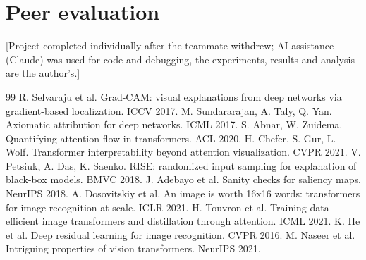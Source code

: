 \documentclass[10pt,twocolumn]{article}
\newcommand{\todo}[1]{{\color{red}[#1]}}
\begin{document}
\section*{Peer evaluation}
\todo{Project completed individually after the teammate withdrew; AI assistance (Claude) was used for code and debugging, the experiments, results and analysis are the author's.}

\begin{thebibliography}{99}\small
{} R. Selvaraju et al. Grad-CAM: visual explanations from deep networks via gradient-based localization. ICCV 2017.
 M. Sundararajan, A. Taly, Q. Yan. Axiomatic attribution for deep networks. ICML 2017.
 S. Abnar, W. Zuidema. Quantifying attention flow in transformers. ACL 2020.
 H. Chefer, S. Gur, L. Wolf. Transformer interpretability beyond attention visualization. CVPR 2021.
 V. Petsiuk, A. Das, K. Saenko. RISE: randomized input sampling for explanation of black-box models. BMVC 2018.
 J. Adebayo et al. Sanity checks for saliency maps. NeurIPS 2018.
 A. Dosovitskiy et al. An image is worth 16x16 words: transformers for image recognition at scale. ICLR 2021.
 H. Touvron et al. Training data-efficient image transformers and distillation through attention. ICML 2021.
 K. He et al. Deep residual learning for image recognition. CVPR 2016.
 M. Naseer et al. Intriguing properties of vision transformers. NeurIPS 2021.
\end{thebibliography}
\end{document}
